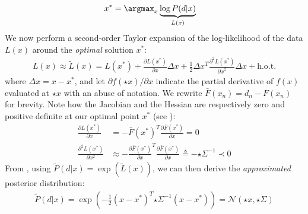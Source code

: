 %
\begin{align}
x^* &= \argmax_{x} \underbrace{\log  P(d|x)}_{L(x)}
\label{eq:independent}
\end{align}
%
We now perform a second-order Taylor expansion of the log-likelihood of the data $L(x)$ around the \emph{optimal} solution $x^*$:
%
\begin{align}
L(x) \approx \tilde{L}(x) = L(x^*)   
+ \tfrac{\partial L(x^*) }{\partial x}  \Delta x 
+ \tfrac{1}{2} \Delta x^T\tfrac{\partial^2 L(x^*)}{{\partial x}^2} \Delta x + \text{h.o.t.}
\label{eq:taylor}
\end{align}
%
where $\Delta x=x - x^*$, and let {\small $\partial f(\star{x})/\partial x$} indicate the partial derivative of $f(x)$ evaluated at $\star{x}$  with an abuse of notation. We rewrite {\small $\bar{F}(x_n) = d_n - F(x_n)$} for brevity. Note how the Jacobian and the Hessian are respectively zero and positive definite at our optimal point $x^*$ (see \cite[Sec.~10.2]{nocedal2006numerical}):
%
\begin{align}
\tfrac{\partial L(x^*)}{\partial x} &= - \bar{F}(x^*)^T 
\tfrac{\partial \bar{F}(x^*)}{\partial x} = 0 
\label{eq:taylor-jacobian}
\\
\tfrac{\partial^2 L(x^*)}{\partial x^2} 
& \approx - \tfrac{\partial \bar{F}(x^*)}{\partial x}^T \tfrac{\partial \bar{F}(x^*)}{\partial x}
\triangleq %
-{\star{\Sigma}}^{-1} \prec 0
\label{eq:taylor-hessian}
\end{align}
% 
From , using $\tilde P(d|x) = \exp (\tilde{L}(x))$, we can then derive the \emph{approximated} posterior distribution:
%
\begin{align}
\tilde{P}(d|x) = \exp\left(- \tfrac{1}{2}(x - x^*)^T {\star{\Sigma}}^{-1}  (x - x^*) \right) = \mathcal{N}\left(\star{x}, \star{\Sigma} \right)
\end{align}
\fi



